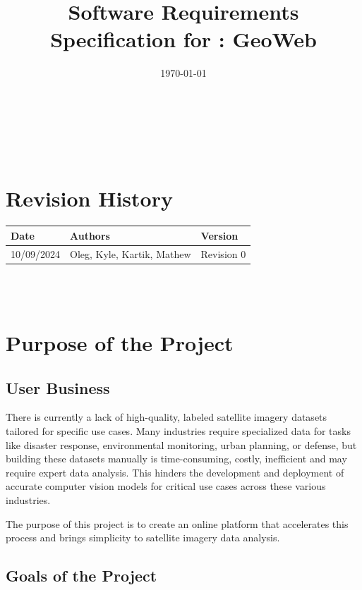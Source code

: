 \documentclass[12pt]{article}
\begin{document}
\title{Software Requirements Specification for \progname: GeoWeb} 
\author{\authname}
\date{\today}
	
\maketitle

~\newpage


\tableofcontents

~\newpage

\section*{Revision History}

\begin{tabularx}{\textwidth}{p{3cm}p{2cm}X}
\toprule {\textbf{Date}} & {\textbf{Authors}} & {\textbf{Version}}\\
\midrule
10/09/2024 & Oleg, Kyle, Kartik, Mathew & Revision 0\\

\bottomrule
\end{tabularx}

~\\

~\newpage
\section{Purpose of the Project}
\subsection{User Business}
There is currently a lack of high-quality, labeled satellite imagery datasets tailored for specific use cases. Many industries require specialized data for tasks like disaster 
response, environmental monitoring, urban planning, or defense, but building these datasets manually is time-consuming, costly, inefficient and may require expert data analysis. 
This hinders the development and deployment of accurate computer vision models for critical use cases across these various industries.

The purpose of this project is to create an online platform that accelerates this process and brings simplicity to satellite imagery data analysis.
\subsection{Goals of the Project}
\end{document}
